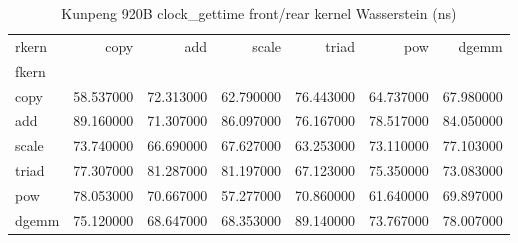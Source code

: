 \begin{table}
\caption{Kunpeng 920B clock_gettime front/rear kernel Wasserstein (ns)}
\begin{tabular}{lrrrrrr}
\toprule
rkern & copy & add & scale & triad & pow & dgemm \\
fkern &  &  &  &  &  &  \\
\midrule
copy & 58.537000 & 72.313000 & 62.790000 & 76.443000 & 64.737000 & 67.980000 \\
add & 89.160000 & 71.307000 & 86.097000 & 76.167000 & 78.517000 & 84.050000 \\
scale & 73.740000 & 66.690000 & 67.627000 & 63.253000 & 73.110000 & 77.103000 \\
triad & 77.307000 & 81.287000 & 81.197000 & 67.123000 & 75.350000 & 73.083000 \\
pow & 78.053000 & 70.667000 & 57.277000 & 70.860000 & 61.640000 & 69.897000 \\
dgemm & 75.120000 & 68.647000 & 68.353000 & 89.140000 & 73.767000 & 78.007000 \\
\bottomrule
\end{tabular}
\end{table}
